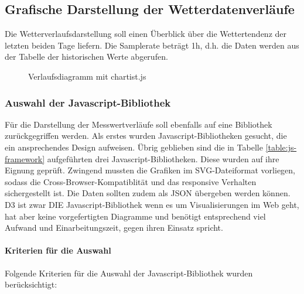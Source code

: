 \subsection{Grafische Darstellung der Wetterdatenverläufe}
Die Wetterverlaufsdarstellung soll einen Überblick über die Wettertendenz der letzten beiden Tage liefern. Die Samplerate beträgt 1h, d.h. die Daten werden aus der Tabelle der historischen Werte abgerufen.

\begin{figure}[h!]
	\centering
	\caption{Verlaufsdiagramm mit chartist.js}
	\label{img:charts}
\end{figure}



\subsubsection{Auswahl der Javascript-Bibliothek}
Für die Darstellung der Messwertverläufe soll ebenfalls auf eine Bibliothek zurückgegriffen werden. Als erstes wurden Javascript-Bibliotheken gesucht, die ein ansprechendes Design aufweisen. Übrig geblieben sind die in Tabelle \ref{table:js-framework} aufgeführten drei Javascript-Bibliotheken. Diese wurden auf ihre Eignung geprüft. Zwingend mussten die Grafiken im SVG-Dateiformat vorliegen, sodass die Cross-Browser-Kompatiblität und das responsive Verhalten sichergestellt ist. Die Daten sollten zudem als JSON übergeben werden können. D3 ist zwar DIE Javascript-Bibliothek wenn es um Visualisierungen im Web geht, hat aber keine vorgefertigten Diagramme und benötigt entsprechend viel Aufwand und Einarbeitungszeit, gegen ihren Einsatz spricht.



\paragraph*{Kriterien für die Auswahl}
Folgende Kriterien für die Auswahl der Javascript-Bibliothek wurden berücksichtigt:

